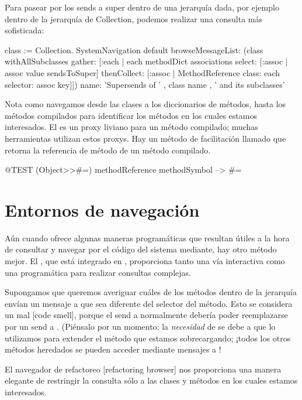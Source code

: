 \documentclass[a4paper,10pt,twoside]{book}
\begin{document}
Para pasear por los sends a super dentro de una jerarquía dada, por
ejemplo dentro de la jerarquía de Collection, podemos realizar una
consulta más sofisticada:
\begin{code}{}
class := Collection.
SystemNavigation default
  browseMessageList: (class withAllSubclasses gather: [:each |
    each methodDict associations
      select: [:assoc | assoc value sendsToSuper]
      thenCollect: [:assoc | MethodReference class: each selector: assoc key]])
  name: 'Supersends of ' , class name , ' and its subclasses'
\end{code}
Nota como navegamos desde las clases a los diccionarios de métodos,
hasta los métodos compilados para identificar los métodos en los
cuales estamos interesados.  El  es un proxy
liviano para un método compilado; muchas herramientas utilizan estos
proxys.  Hay un método de facilitación llamado
 que retorna la referencia
de método de un método compilado.
\begin{code}{@TEST}
(Object>>#=) methodReference methodSymbol --> #=
\end{code}

\section{Entornos de navegación}

Aún cuando  ofrece algunas maneras
programáticas que resultan útiles a la hora de consultar y navegar por
el código del sistema mediante, hay otro método mejor.  El
, que está integrado en \pharo, proporciona
tanto una vía interactiva como una programática para realizar
consultas complejas.

Supongamos que queremos averiguar cuáles de los métodos dentro de la
jerarquía  envían un mensaje a \super que sea diferente
del selector del método.  Esto se considera un mal  [code smell], porque el send a \super normalmente debería
poder reemplazarse por un send a \self. (Piénsalo por un momento: la
\emph{necesidad} de \super se debe a que lo utilizamos para extender
el método que estamos sobrecargando; ¡todos los otros métodos
heredados se pueden acceder mediante mensajes a \self!

El navegador de refactoreo [refactoring browser] nos proporciona una
manera elegante de restringir la consulta sólo a las clases y métodos
en los cuales estamos interesados.
\end{document}
